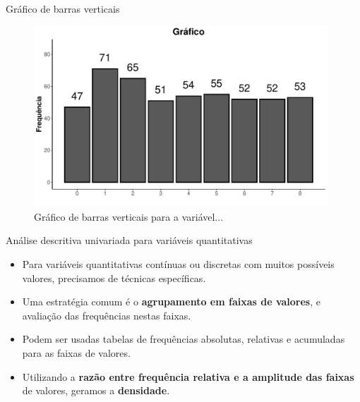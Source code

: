 \documentclass[
  ignorenonframetext,
  serif,
  professionalfont,
  usenames,
  dvipsnames,
  aspectratio = 169]{beamer}
\begin{document}
\begin{frame}{Gráfico de barras verticais}
\protect\hypertarget{gruxe1fico-de-barras-verticais-2}{}
\begin{figure}

{\centering \includegraphics[width=11cm]{200-exploratoria-uni-tabelas-graficos_files/figure-beamer/unnamed-chunk-17-1} 

}

\caption{Gráfico de barras verticais para a variável...}\label{fig:unnamed-chunk-17}
\end{figure}
\end{frame}

\begin{frame}{Análise descritiva univariada para variáveis
quantitativas}
\protect\hypertarget{anuxe1lise-descritiva-univariada-para-variuxe1veis-quantitativas-2}{}
\begin{itemize}
\item
  Para variáveis quantitativas contínuas ou discretas com muitos
  possíveis valores, precisamos de técnicas específicas.
\item
  Uma estratégia comum é o \textbf{agrupamento em faixas de valores}, e
  avaliação das frequências nestas faixas.
\item
  Podem ser usadas tabelas de frequências absolutas, relativas e
  acumuladas para as faixas de valores.
\item
  Utilizando a
  \textbf{razão entre frequência relativa e a amplitude das faixas} de
  valores, geramos a \textbf{densidade}.
\end{itemize}
\end{frame}
\end{document}
